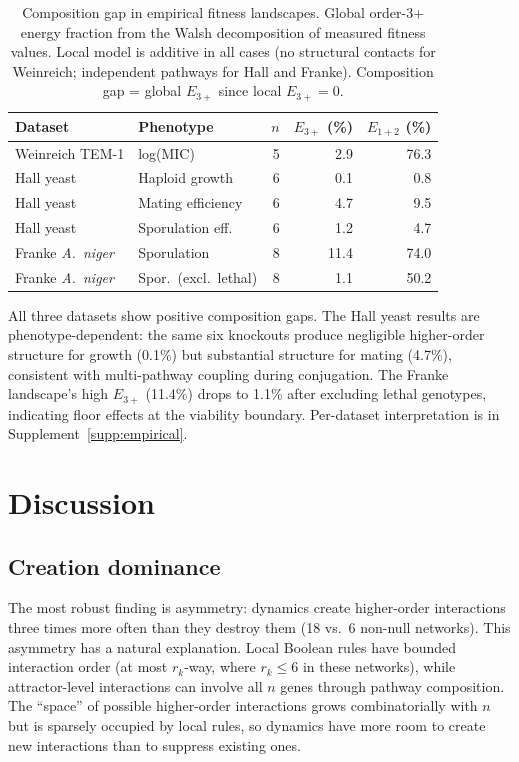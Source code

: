 \documentclass[10pt]{article}
\begin{document}
\begin{table}[t]
\centering
\caption{Composition gap in empirical fitness landscapes. Global
order-3+ energy fraction from the Walsh decomposition of measured
fitness values. Local model is additive in all cases (no structural
contacts for Weinreich; independent pathways for Hall and Franke).
Composition gap = global $E_{3+}$ since local $E_{3+} = 0$.}
\label{tab:empirical}
\begin{tabular}{llrrr}
\toprule
Dataset & Phenotype & $n$ & $E_{3+}$ (\%) & $E_{1+2}$ (\%) \\
\midrule
Weinreich TEM-1 & log(MIC) & 5 & 2.9 & 76.3 \\
Hall yeast & Haploid growth & 6 & 0.1 & 0.8 \\
Hall yeast & Mating efficiency & 6 & 4.7 & 9.5 \\
Hall yeast & Sporulation eff. & 6 & 1.2 & 4.7 \\
Franke \emph{A.~niger} & Sporulation & 8 & 11.4 & 74.0 \\
Franke \emph{A.~niger} & Spor.\ (excl.\ lethal) & 8 & 1.1 & 50.2 \\
\bottomrule
\end{tabular}
\end{table}

All three datasets show positive composition gaps. The Hall yeast
results are phenotype-dependent: the same six knockouts produce
negligible higher-order structure for growth (0.1\%) but substantial
structure for mating (4.7\%), consistent with multi-pathway coupling
during conjugation. The Franke landscape's high $E_{3+}$ (11.4\%)
drops to 1.1\% after excluding lethal genotypes, indicating floor
effects at the viability boundary. Per-dataset interpretation is in
Supplement~\ref{supp:empirical}.


\section{Discussion}
\label{sec:discussion}

\subsection{Creation dominance}

The most robust finding is asymmetry: dynamics create higher-order
interactions three times more often than they destroy them (18 vs.\ 6
non-null networks). This asymmetry has a natural explanation. Local
Boolean rules have bounded interaction order (at most $r_k$-way,
where $r_k \leq 6$ in these networks), while attractor-level
interactions can involve all $n$ genes through pathway composition.
The ``space'' of possible higher-order interactions grows
combinatorially with $n$ but is sparsely occupied by local rules,
so dynamics have more room to create new interactions than to
suppress existing ones.
\end{document}
